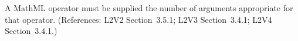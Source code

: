 A MathML operator must be supplied the number of arguments appropriate for
that operator.  (References: L2V2 Section~3.5.1; L2V3 Section~3.4.1; L2V4 Section~3.4.1.)
